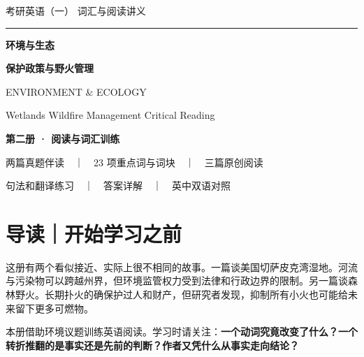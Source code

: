 \documentclass[a4paper,11pt,openany]{report}
\begin{document}
\begin{titlepage}
\thispagestyle{empty}
\sffamily
\vspace*{12mm}
{\CJKsf\color{leaf}\large 考研英语（一） \textbar{} 词汇与阅读讲义}\par
\vspace{40mm}
{\color{accentgold}\rule{22mm}{2pt}}\par
\vspace{10mm}
{\CJKsf\color{deepforest}\fontsize{34}{44}\selectfont\bfseries 环境与生态}\par
\vspace{4mm}
{\CJKsf\color{deepforest}\fontsize{20}{28}\selectfont\bfseries 保护政策与野火管理}\par
\vspace{13mm}
{\color{leaf}\fontsize{13}{18}\selectfont ENVIRONMENT \& ECOLOGY}\par
\vspace{3mm}
{\color{bodygrey}\fontsize{11}{17}\selectfont Wetlands \textperiodcentered{} Wildfire Management \textperiodcentered{} Critical Reading}\par
\vfill
\begin{tcolorbox}[colback=softsand,colframe=softsand,boxrule=0pt,arc=1mm,left=4mm,right=4mm,top=5mm,bottom=5mm]
{\CJKsf\color{deepforest}\bfseries 第二册 · 阅读与词汇训练}\par\vspace{1mm}
{\CJKsf\color{bodygrey}\normalsize 两篇真题伴读　｜　23 项重点词与词块　｜　三篇原创阅读}\par
{\CJKsf\color{bodygrey}\normalsize 句法和翻译练习　｜　答案详解　｜　英中双语对照}\par
\end{tcolorbox}
\vspace{12mm}
\end{titlepage}
\tableofcontents
\clearpage
{}
\chapter{导读｜开始学习之前}\label{ux5bfcux8bfbux5f00ux59cbux5b66ux4e60ux4e4bux524d}

这册有两个看似接近、实际上很不相同的故事。一篇谈美国切萨皮克湾湿地。河流与污染物可以跨越州界，但环境监管权力受到法律和行政边界的限制。另一篇谈森林野火。长期扑火的确保护过人和财产，但研究者发现，抑制所有小火也可能给未来留下更多可燃物。

本册借助环境议题训练英语阅读。学习时请关注：\textbf{一个动词究竟改变了什么？一个转折推翻的是事实还是先前的判断？作者又凭什么从事实走向结论？}
\end{document}
